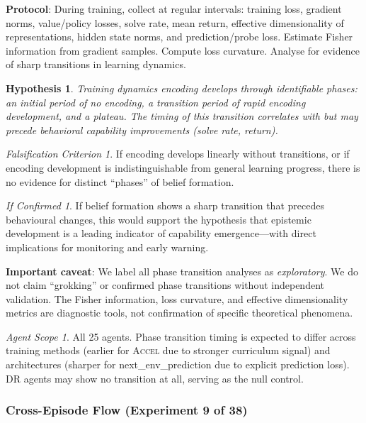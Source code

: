 \documentclass[11pt,a4paper]{article}
\newtheorem{hypothesis}{Hypothesis}[subsection]
\theoremstyle{remark}
\newtheorem*{falsification}{Falsification Criterion}
\newtheorem*{implication}{If Confirmed}
\newtheorem*{agentscope}{Agent Scope}
\newcommand{\accel}{\textsc{Accel}}
\newcommand{\dr}{\textsc{DR}}
\begin{document}
\textbf{Protocol}: During training, collect at regular intervals: training loss, gradient norms, value/policy losses, solve rate, mean return, effective dimensionality of representations, hidden state norms, and prediction/probe loss. Estimate Fisher information from gradient samples. Compute loss curvature. Analyse for evidence of sharp transitions in learning dynamics.

\begin{hypothesis}
Training dynamics encoding develops through identifiable phases: an initial period of no encoding, a transition period of rapid encoding development, and a plateau. The timing of this transition correlates with but may precede behavioral capability improvements (solve rate, return).
\end{hypothesis}

\begin{falsification}
If encoding develops linearly without transitions, or if encoding development is indistinguishable from general learning progress, there is no evidence for distinct ``phases'' of belief formation.
\end{falsification}

\begin{implication}
If belief formation shows a sharp transition that precedes behavioural changes, this would support the hypothesis that epistemic development is a leading indicator of capability emergence---with direct implications for monitoring and early warning.
\end{implication}

\textbf{Important caveat}: We label all phase transition analyses as \textit{exploratory}. We do not claim ``grokking'' or confirmed phase transitions without independent validation. The Fisher information, loss curvature, and effective dimensionality metrics are diagnostic tools, not confirmation of specific theoretical phenomena.

\begin{agentscope}
All 25 agents. Phase transition timing is expected to differ across training methods (earlier for \accel{} due to stronger curriculum signal) and architectures (sharper for next\_env\_prediction due to explicit prediction loss). \dr{} agents may show no transition at all, serving as the null control.
\end{agentscope}

\subsubsection{Cross-Episode Flow (Experiment 9 of 38)}
\label{exp:cross_episode_flow}
\end{document}
